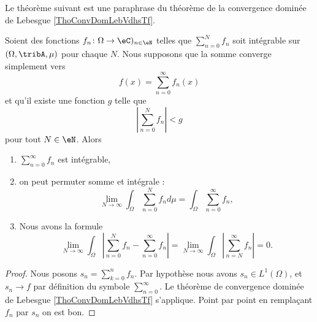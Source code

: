 Le théorème suivant est une paraphrase du théorème de la convergence dominée de Lebesgue \ref{ThoConvDomLebVdhsTf}.
\begin{theorem}     \label{ThoockMHn}
	Soient des fonctions \( f_n \colon \Omega\to \eC )_{n\in \eN}\) telles que \( \sum_{n=0}^Nf_n\) soit intégrable sur \( (\Omega,\tribA,\mu)\) pour chaque \( N\). Nous supposons que la somme converge simplement vers
	\begin{equation}
		f(x)=\sum_{n=0}^{\infty}f_n(x)
	\end{equation}
	et qu'il existe une fonction \( g\) telle que
	\begin{equation}
		\left| \sum_{n=0}^Nf_n \right| <g
	\end{equation}
	pour tout \( N\in \eN\). Alors
	\begin{enumerate}
		\item
		      \( \sum_{n=0}^{\infty}f_n\) est intégrable,
		\item
		      on peut permuter somme et intégrale :
		      \begin{equation}
			      \lim_{N\to \infty} \int_{\Omega}\sum_{n=0}^Nf_nd\mu=\int_{\Omega}\sum_{n=0}^{\infty}f_n,
		      \end{equation}
		\item
		      Nous avons la formule
		      \begin{equation}
			      \lim_{N\to \infty} \int_{\Omega}\left| \sum_{n=0}^Nf_n-\sum_{n=0}^{\infty}f_n \right| =\lim_{N\to \infty} \int_{\Omega}\left| \sum_{n=N}^{\infty}f_n \right| =0.
		      \end{equation}
	\end{enumerate}
\end{theorem}

\begin{proof}
	Nous posons \( s_n=\sum_{k=0}^nf_n\). Par hypothèse nous avons \( s_n\in L^1(\Omega)\), et \( s_n\to f\) par définition du symbole \( \sum_{n=0}^{\infty}\). Le théorème de convergence dominée de Lebesgue \ref{ThoConvDomLebVdhsTf} s'applique. Point par point en remplaçant \( f_n\) par \( s_n\) on est bon.
\end{proof}


